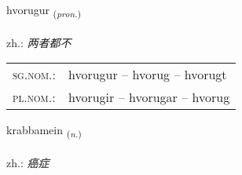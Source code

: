 \documentclass[frontgrid, backgrid]{flacards}\usepackage[]{graphicx}\usepackage[]{xcolor}
\begin{document}
\renewcommand{\flhead}{\vskip5pt \fboxsep=0pt {\small\bfseries\footnotesize Fornafn | 代词}}
\renewcommand{\fcfoot}{\vskip5pt \fboxsep=0pt \hspace{2pt}{\small\bfseries\footnotesize 3K}}

\renewcommand{\blhead}{\vskip5pt {\small\bfseries\footnotesize Fornafn | 代词 }}
\renewcommand{\bcfoot}{\vskip5pt \hspace{2pt}{\small\bfseries\footnotesize 3K}}


{hvorugur \small{\textsubscript{(\textit{pron.})}} \\[1ex] %
\textphonetic{[kʰvɔːrʏɣʏr]} \\
zh.: \emph{两者都不} \\  [2ex]
\renewcommand*{\arraystretch}{0.8}
\begin{tabular}{ll}
\textsc{sg.nom.}: & hvorugur  --  hvorug -- hvorugt \\ 
\textsc{pl.nom.}: & hvorugir -- hvorugar -- hvorug
\end{tabular}
}

\renewcommand{\flhead}{\vskip5pt \fboxsep=0pt {\small\bfseries\footnotesize Nafnorð | 名词}}
\renewcommand{\fcfoot}{\vskip5pt \fboxsep=0pt \hspace{2pt}{\small\bfseries\footnotesize 3K}}

\renewcommand{\blhead}{\vskip5pt {\small\bfseries\footnotesize Nafnorð | 名词 }}
\renewcommand{\bcfoot}{\vskip5pt \hspace{2pt}{\small\bfseries\footnotesize 3K}}


{krabbamein \small{\textsubscript{(\textit{n.})}} \\[1ex] %
\textphonetic{[kʰrapamein]} \\
zh.: \emph{癌症} \\  [2ex]
\renewcommand*{\arraystretch}{0.8}
}
\end{document}
